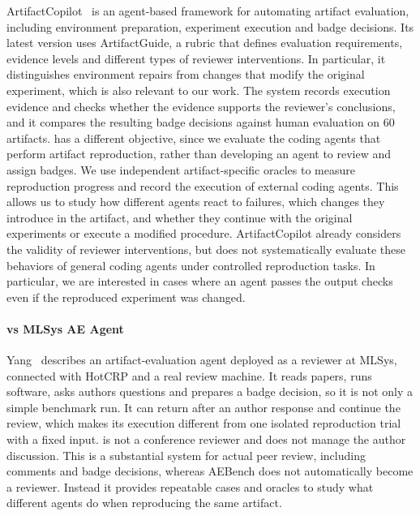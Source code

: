 ArtifactCopilot~\cite{wu-arxiv26} is an agent-based framework for automating
  artifact evaluation, including environment preparation, experiment execution
  and badge decisions.
Its latest version uses ArtifactGuide, a rubric that defines evaluation
  requirements, evidence levels and different types of reviewer interventions.
In particular, it distinguishes environment repairs from changes that modify
  the original experiment, which is also relevant to our work.
The system records execution evidence and checks whether the evidence supports
  the reviewer's conclusions, and it compares the resulting badge decisions
  against human evaluation on 60 artifacts.
\aebench has a different objective, since we evaluate the coding agents that
  perform artifact reproduction, rather than developing an agent to review
  and assign badges.
We use independent artifact-specific oracles to measure reproduction progress
  and record the execution of external coding agents.
This allows us to study how different agents react to failures, which changes
  they introduce in the artifact, and whether they continue with the original
  experiments or execute a modified procedure.
ArtifactCopilot already considers the validity of reviewer interventions,
  but does not systematically evaluate these behaviors of general coding agents
  under controlled reproduction tasks.
In particular, we are interested in cases where an agent passes the output
  checks even if the reproduced experiment was changed.

\paragraph{\aebench vs MLSys AE Agent}
Yang~\cite{yang-blog26} describes an artifact-evaluation agent deployed as a reviewer
  at MLSys, connected with HotCRP and a real review machine.
It reads papers, runs software, asks authors questions and prepares a badge decision,
  so it is not only a simple benchmark run.
It can return after an author response and continue the review, which makes its
  execution different from one isolated reproduction trial with a fixed input.
\aebench is not a conference reviewer and does not manage the author discussion.
This is a substantial system for actual peer review, including comments and badge
  decisions, whereas AEBench does not automatically become a reviewer.
Instead it provides repeatable cases and oracles to study what different agents do
  when reproducing the same artifact.

